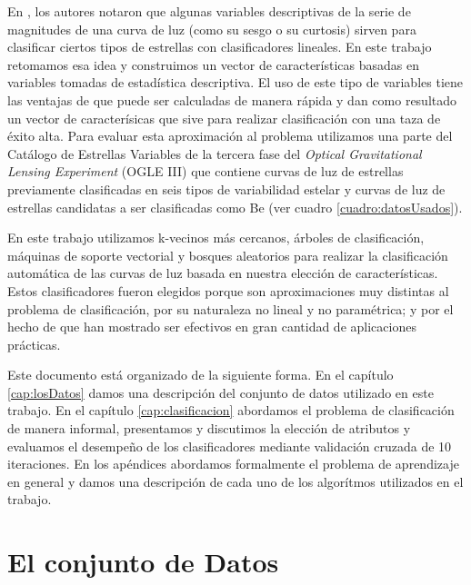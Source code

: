 \documentclass[letterpaper,12pt]{book}
\begin{document}
En \cite{rodriguez_feliciano_alisis_2012, sabogal_search_2014}, los autores notaron que algunas variables descriptivas de la serie de magnitudes de una curva de luz (como su sesgo o su curtosis) sirven para clasificar ciertos tipos de estrellas con clasificadores lineales. En este trabajo retomamos esa idea y construimos un vector de características basadas en variables tomadas de estadística descriptiva. El uso de este tipo de variables tiene las ventajas de que puede ser calculadas de manera rápida y dan como resultado un vector de caracterísicas que sive para realizar clasificación con una taza de éxito alta. Para evaluar esta aproximación al problema utilizamos una parte del Catálogo de Estrellas Variables de la tercera fase del \textit{Optical Gravitational Lensing Experiment} (OGLE III)\cite{soszynski_optical_2011-2,soszynski_optical_2010,soszynski_optical_2009-1,soszynski_optical_2011,soszynski_optical_2010-2,soszynski_optical_2008-1,soszynski_optical_2013-1,soszynski_optical_2011-1,soszynski_optical_2009,pawlak_eclipsing_2013,graczyk_optical_2011,poleski_optical_2010,soszynski_optical_2013,soszynski_optical_2010-1,soszynski_optical_2008} que contiene curvas de luz  de estrellas previamente clasificadas en seis tipos de variabilidad estelar y curvas de luz de estrellas candidatas a ser clasificadas como Be (ver cuadro \ref{cuadro:datosUsados}).

En este trabajo utilizamos k-vecinos más cercanos, árboles de clasificación, máquinas de soporte vectorial y bosques aleatorios para realizar la clasificación automática de las curvas de luz basada en nuestra elección de características. Estos clasificadores fueron elegidos porque son aproximaciones muy distintas al problema de clasificación, por su naturaleza no lineal y no paramétrica; y por el hecho de que han mostrado ser efectivos en gran cantidad de aplicaciones prácticas. 

Este documento está organizado de la siguiente forma. En el capítulo \ref{cap:losDatos} damos una descripción del conjunto de datos utilizado en este trabajo. En el capítulo \ref{cap:clasificacion} abordamos el problema de clasificación de manera informal, presentamos y discutimos la elección de atributos y evaluamos el desempeño de los clasificadores mediante validación cruzada de 10 iteraciones. En los apéndices abordamos formalmente el problema de aprendizaje en general y damos una descripción de cada uno de los algorítmos utilizados en el trabajo.




\chapter{El conjunto de Datos\label{cap:losDatos}}
\end{document}

